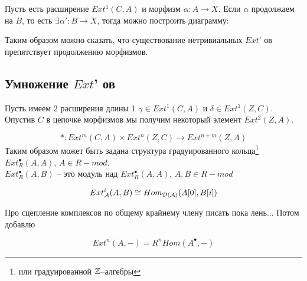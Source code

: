 \documentclass[../hw_main.tex]{subfiles}
\begin{document}
Пусть есть расширение $Ext^1(C, A)$ и морфизм $\alpha\colon A\rightarrow X$. Если $\alpha$ продолжаем на $B$, то есть $\exists \alpha' \colon B \rightarrow X$, тогда можно построить диаграмму:
\bee
{}
\eee
Таким образом можно сказать, что существование нетривиальных $Ext$' ов препятствует продолжению морфизмов.
\subsection{Умножение $Ext$' ов}
Пусть имеем 2 расширения длины 1 $\gamma \in Ext^1(C, A)$ и $\delta \in Ext^1(Z, C)$. Опустив $C$ в цепочке морфизмов мы получим некоторый элемент $Ext^2(Z, A)$.
\bee
{}
\eee
\[
* \colon Ext^m (C, A) \times Ext^n(Z, C) \rightarrow Ext^{n+m}(Z, A)
\]
Таким образом может быть задана структура градуированного кольца\footnote{или градуированной $\mathbb{Z}$--алгебры} $Ext_{R}^\bullet (A, A)$, $A\in R-mod $.\\
$Ext_{R}^\bullet(A, B)$ -- это модуль над $Ext_{R}^\bullet(A, A)$, $A, B \in R-mod $
\begin{to_claim}
\[Ext_{\mathcal{A}}^i(A, B) \cong Hom_{\mathcal{D(A)}}(A[0], B[i])\]
\bee
\eee
\end{to_claim}
{\color{green} Про сцепление комплексов по общему крайнему члену писать пока лень... Потом добавлю}
\begin{to_claim}
\[
Ext^n(A, -) = R^n Hom(A^\bullet, -)
\]
\end{to_claim}
\end{document}
